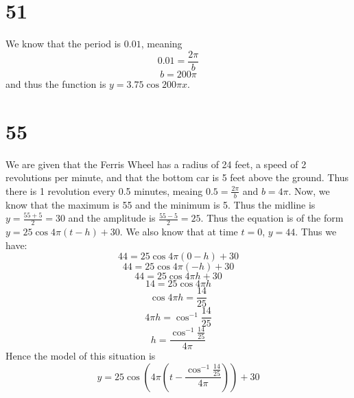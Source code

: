 \documentclass{article}
\theoremstyle{definition}
\newcommand{\?}{\stackrel{?}{=}}
\begin{document}
\section*{51}
We know that the period is $0.01$, meaning \[ 0.01=\frac{2\pi}{b} \] \[ b=200\pi \] and thus the function is $y=3.75\cos 200\pi x$.

\section*{55}
We are given that the Ferris Wheel has a radius of 24 feet, a speed of 2 revolutions per minute, and that the bottom car is 5 feet above the ground. Thus there is 
1 revolution every 0.5 minutes, meaing $0.5=\frac{2\pi}{b}$ and $b=4\pi$. Now, we know that the maximum is 55 and the minimum is 5. Thus the midline is 
$y=\frac{55+5}{2}=30$ and the amplitude is $\frac{55-5}{2}=25$. Thus the equation is of the form 
$y=25\cos 4\pi(t-h)+30$. We also know that at time $t=0$, $y=44$. Thus we have:
\[ 44=25\cos 4\pi(0-h)+30 \]
\[ 44=25\cos 4\pi(-h)+30 \]
\[ 44=25\cos 4\pi h+30 \]
\[ 14=25\cos 4\pi h \]
\[ \cos 4\pi h=\frac{14}{25} \]
\[ 4\pi h=\cos^{-1}\frac{14}{25} \]
\[ h=\dfrac{\cos^{-1}\frac{14}{25}}{4\pi} \]
Hence the model of this situation is
\[ y=25\cos \left(4\pi(t-\dfrac{\cos^{-1}\frac{14}{25}}{4\pi})\right)+30 \]
\end{document}
